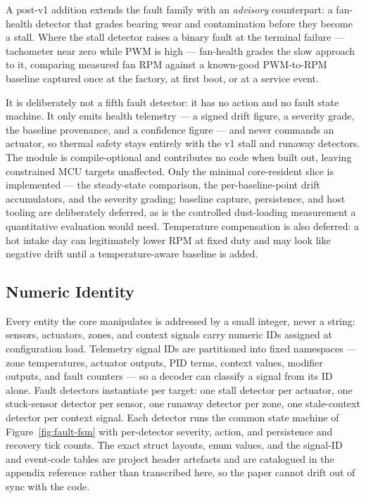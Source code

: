 A post-v1 addition extends the fault family with an \emph{advisory} counterpart: a fan-health detector that grades bearing wear and contamination before they become a stall. Where the stall detector raises a binary fault at the terminal failure --- tachometer near zero while PWM is high --- fan-health grades the slow approach to it, comparing measured fan RPM against a known-good PWM-to-RPM baseline captured once at the factory, at first boot, or at a service event.

It is deliberately not a fifth fault detector: it has no action and no fault state machine. It only emits health telemetry --- a signed drift figure, a severity grade, the baseline provenance, and a confidence figure --- and never commands an actuator, so thermal safety stays entirely with the v1 stall and runaway detectors. The module is compile-optional and contributes no code when built out, leaving constrained MCU targets unaffected. Only the minimal core-resident slice is implemented --- the steady-state comparison, the per-baseline-point drift accumulators, and the severity grading; baseline capture, persistence, and host tooling are deliberately deferred, as is the controlled dust-loading measurement a quantitative evaluation would need. Temperature compensation is also deferred: a hot intake day can legitimately lower RPM at fixed duty and may look like negative drift until a temperature-aware baseline is added.

\subsection{Numeric Identity}

Every entity the core manipulates is addressed by a small integer, never a string: sensors, actuators, zones, and context signals carry numeric IDs assigned at configuration load. Telemetry signal IDs are partitioned into fixed namespaces --- zone temperatures, actuator outputs, PID terms, context values, modifier outputs, and fault counters --- so a decoder can classify a signal from its ID alone. Fault detectors instantiate per target: one stall detector per actuator, one stuck-sensor detector per sensor, one runaway detector per zone, one stale-context detector per context signal. Each detector runs the common state machine of Figure~\ref{fig:fault-fsm} with per-detector severity, action, and persistence and recovery tick counts. The exact struct layouts, enum values, and the signal-ID and event-code tables are project header artefacts and are catalogued in the appendix reference rather than transcribed here, so the paper cannot drift out of sync with the code.

\endinput
